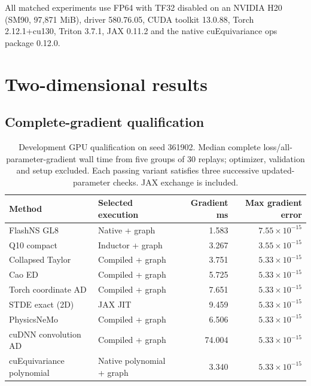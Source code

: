 \documentclass[11pt]{article}
\begin{document}
All matched experiments use FP64 with TF32 disabled on an NVIDIA H20 (SM90,
97,871 MiB), driver 580.76.05, CUDA toolkit 13.0.88, Torch 2.12.1+cu130,
Triton 3.7.1, JAX 0.11.2 and the native cuEquivariance ops package 0.12.0.

\section{Two-dimensional results}

\subsection{Complete-gradient qualification}

\begin{table}[t]
\centering\small
\setlength{\tabcolsep}{4pt}
\caption{Development GPU qualification on seed 361902. Median complete loss/all-parameter-gradient wall time from five groups of 30 replays; optimizer, validation and setup excluded. Each passing variant satisfies three successive updated-parameter checks. JAX exchange is included.}
\label{tab:qualification}
\begin{tabular}{llrr}\toprule
Method & Selected execution & Gradient ms & Max gradient error\\\midrule
FlashNS GL8 & Native + graph & 1.583 & $7.55\times10^{-15}$\\
Q10 compact & Inductor + graph & 3.267 & $3.55\times10^{-15}$\\
Collapsed Taylor & Compiled + graph & 3.751 & $5.33\times10^{-15}$\\
Cao ED & Compiled + graph & 5.725 & $5.33\times10^{-15}$\\
Torch coordinate AD & Compiled + graph & 7.651 & $5.33\times10^{-15}$\\
STDE exact (2D) & JAX JIT & 9.459 & $5.33\times10^{-15}$\\
PhysicsNeMo & Compiled + graph & 6.506 & $5.33\times10^{-15}$\\
cuDNN convolution AD & Compiled + graph & 74.004 & $5.33\times10^{-15}$\\
cuEquivariance polynomial & Native polynomial + graph & 3.340 & $5.33\times10^{-15}$\\
\bottomrule\end{tabular}
\end{table}
\end{document}
